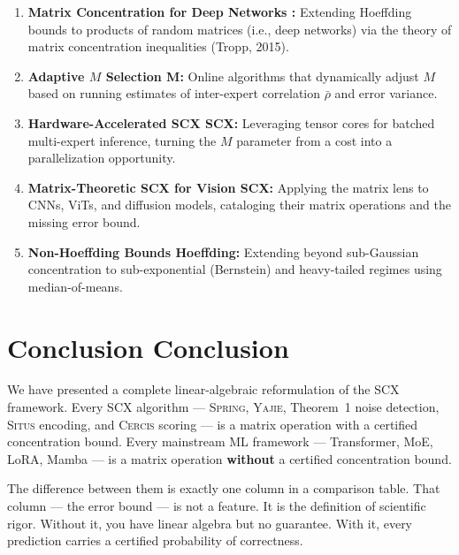 \documentclass[12pt,a4paper]{article}
\theoremstyle{definition}
\newcommand{\Situs}{\textsc{Situs}}
\newcommand{\Yajie}{\textsc{Yajie}}
\newcommand{\Spring}{\textsc{Spring}}
\newcommand{\Cercis}{\textsc{Cercis}}
\newcommand{\SCX}{\textsc{SCX}}
\begin{document}
\begin{enumerate}[label=(\arabic*)]
    \item \textbf{Matrix Concentration for Deep Networks :} 
    Extending Hoeffding bounds to products of random matrices (i.e., deep networks) 
    via the theory of matrix concentration inequalities (Tropp, 2015).
    
    \item \textbf{Adaptive $M$ Selection M:} Online algorithms that 
    dynamically adjust $M$ based on running estimates of inter-expert correlation 
    $\bar{\rho}$ and error variance.
    
    \item \textbf{Hardware-Accelerated SCX SCX:} Leveraging tensor cores 
    for batched multi-expert inference, turning the $M$ parameter from a cost into 
    a parallelization opportunity.
    
    \item \textbf{Matrix-Theoretic SCX for Vision SCX:} Applying 
    the matrix lens to CNNs, ViTs, and diffusion models, cataloging their matrix 
    operations and the missing error bound.
    
    \item \textbf{Non-Hoeffding Bounds Hoeffding:} Extending beyond sub-Gaussian 
    concentration to sub-exponential (Bernstein) and heavy-tailed regimes using median-of-means.
\end{enumerate}

\section{Conclusion Conclusion}
\label{sec:conclusion}

We have presented a complete linear-algebraic reformulation of the \SCX{} framework.
Every \SCX{} algorithm — \Spring{}, \Yajie{}, Theorem~1 noise detection, \Situs{} 
encoding, and \Cercis{} scoring — is a matrix operation with a certified concentration 
bound. Every mainstream ML framework — Transformer, MoE, LoRA, Mamba — is a matrix 
operation \textbf{without} a certified concentration bound.

The difference between them is exactly one column in a comparison table. That column 
— the error bound — is not a feature. It is the definition of scientific rigor. 
Without it, you have linear algebra but no guarantee. With it, every prediction carries 
a certified probability of correctness.
\end{document}
